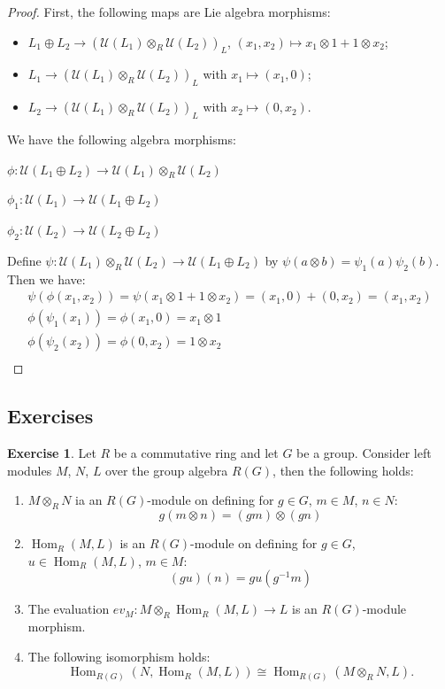 \documentclass[8pt]{article}
\theoremstyle{definition}
\theoremstyle{definition}
\theoremstyle{definition}
\theoremstyle{definition}
\theoremstyle{definition}
\theoremstyle{definition}
\theoremstyle{definition}
\theoremstyle{definition}
\theoremstyle{definition}
\theoremstyle{definition}
\theoremstyle{definition}
\theoremstyle{definition}
\theoremstyle{definition}
\newtheorem{exercise}{Exercise}[section]
\theoremstyle{definition}
\theoremstyle{question}
\begin{document}
\begin{proof}
  First, the following maps are Lie algebra morphisms:
  \begin{itemize}
    \item $L_1 \oplus L_2 \to (\mathcal{U}(L_1) \otimes_R \mathcal{U}(L_2))_L$,
    $(x_1, x_2) \mapsto x_1 \otimes 1 + 1 \otimes x_2$;
    \item $L_1 \to (\mathcal{U}(L_1) \otimes_R \mathcal{U}(L_2))_L$
    with $x_1 \mapsto (x_1, 0)$;
    \item $L_2 \to (\mathcal{U}(L_1) \otimes_R \mathcal{U}(L_2))_L$
    with $x_2 \mapsto (0, x_2)$.
  \end{itemize}

  We have the following algebra morphisms:
  \begin{center}
    $\phi : \mathcal{U}(L_1 \oplus L_2) \to \mathcal{U}(L_1) \otimes_R \mathcal{U}(L_2)$

    $\phi_1 : \mathcal{U}(L_1) \to \mathcal{U}(L_1 \oplus L_2)$

    $\phi_2 : \mathcal{U}(L_2) \to \mathcal{U}(L_2 \oplus L_2)$
  \end{center}

  Define $\psi : \mathcal{U}(L_1) \otimes_R \mathcal{U}(L_2) \to \mathcal{U}(L_1 \oplus L_2)$
  by $\psi(a \otimes b) = \psi_1(a) \psi_2(b)$. Then we have:
  \[
  \begin{array}{lll}
    & \psi(\phi (x_1, x_2)) = \psi(x_1 \otimes 1 + 1 \otimes x_2) = (x_1, 0) + (0, x_2) = (x_1, x_2) & \\
    & \phi (\psi_1(x_1)) = \phi(x_1, 0) = x_1 \otimes 1 & \\
    & \phi (\psi_2(x_2)) = \phi(0, x_2) = 1 \otimes x_2 & \\
  \end{array}
  \]
\end{proof}

\subsection{Exercises}

\begin{exercise}
  Let $R$ be a commutative ring and let $G$ be a group. Consider left modules $M$, $N$, $L$ over the group algebra $R(G)$, then the following holds:
  \begin{enumerate}
    \item $M \otimes_R N$ ia an $R(G)$-module on defining for $g \in G$, $m \in M$, $n \in N$:
    \[
    g(m \otimes n) = (gm) \otimes (gn)
    \]
    \item $\operatorname{Hom}_R(M,L)$ is an $R(G)$-module on defining for $g \in G$, $u \in \operatorname{Hom}_R(M,L)$, $m \in M$:
    \[
    (gu)(n) = gu(g^{-1}m)
    \]
    \item The evaluation $ev_M : M \otimes_R \operatorname{Hom}_R(M,L) \to L$ is an $R(G)$-module morphism.
    \item The following isomorphism holds:
    \[
    \operatorname{Hom}_{R(G)}(N, \operatorname{Hom}_R(M,L)) \cong \operatorname{Hom}_{R(G)}(M \otimes_R N, L).
    \]
  \end{enumerate}
\end{exercise}
\end{document}
